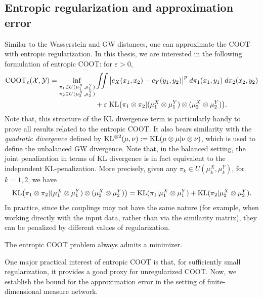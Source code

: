 \subsection{Entropic regularization and approximation error}
Similar to the Wasserstein and GW distances, one can approximate
the COOT with entropic regularization.
In this thesis, we are interested in the following formulation of entropic COOT:
for $\varepsilon > 0$,
\begin{align}
  \text{COOT}_{\varepsilon} (\mathcal X, \mathcal Y) =
  \inf_{\substack{\pi_1 \in U(\mu^X_1, \mu^Y_1) \\
  \pi_2 \in U(\mu^X_2, \mu^Y_2)}} &\iint
  \big\vert c_X(x_1, x_2) - c_Y(y_1, y_2) \big\vert^p \; d\pi_1(x_1, y_1) \; d\pi_2(x_2, y_2) \\
  &+ \varepsilon \; \text{KL} \big( \pi_1 \otimes \pi_2 \vert (\mu^X_1 \otimes \mu^Y_1) \otimes (\mu^X_2 \otimes \mu^Y_2) \big).
\end{align}
Note that, this structure of the KL divergence term is particularly handy to prove all results related to
the entropic COOT. It also bears similarity with the \textit{quadratic divergence}
\citep{Sejourne20} defined by $\text{KL}^{\otimes 2}(\mu, \nu):= \text{KL}(\mu \otimes \mu | \nu \otimes \nu)$,
which is used to define the unbalanced GW divergence. Note that, in the balanced setting,
the joint penalization in terms of KL divergence is in fact equivalent to the
independent KL-penalization. More precisely, given any $\pi_k \in U(\mu_k^X, \mu_k^Y)$,
for $k=1,2$, we have
\begin{equation}
  \text{KL} \big( \pi_1 \otimes \pi_2 \vert (\mu^X_1 \otimes \mu^Y_1) \otimes (\mu^X_2 \otimes \mu^Y_2) \big)
  = \text{KL}(\pi_1 \vert \mu^X_1 \otimes \mu^Y_1) + \text{KL}(\pi_2 \vert \mu^X_2 \otimes \mu^Y_2).
\end{equation}
In practice, since the couplings may not have the same nature (for example,
when working directly with the input data, rather than via the similarity matrix),
they can be penalized by different values of regularization.
\begin{proposition}
The entropic COOT problem always admits a minimizer.
\end{proposition}
One major practical interest of entropic COOT is that, for sufficiently small regularization,
it provides a good proxy for unregularized COOT. Now, we establish the bound for the
approximation error in the setting of finite-dimensional measure network.
